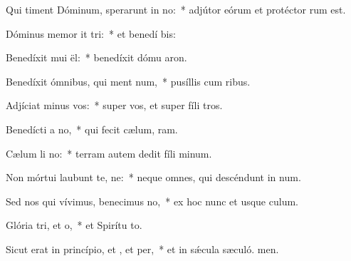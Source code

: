 \item Qui timent Dóminum, sperarunt in no:~* adjútor eórum et protéctor rum est.
\item Dóminus memor it tri:~* et benedí bis:
\item Benedíxit mui ël:~* benedíxit dómu aron.
\item Benedíxit ómnibus, qui ment num,~* pusíllis cum ribus.
\item Adjíciat minus  vos:~* super vos, et super fíli tros.
\item Benedícti  a no,~* qui fecit cælum,  ram.
\item Cælum li no:~* terram autem dedit fíli minum.
\item Non mórtui laubunt te, ne:~* neque omnes, qui descéndunt in num.
\item Sed nos qui vívimus, benecimus no,~* ex hoc nunc et usque  culum.
\item Glória tri, et o,~* et Spirítu to.
\item Sicut erat in princípio, et , et per,~* et in sǽcula sæculó. men.

